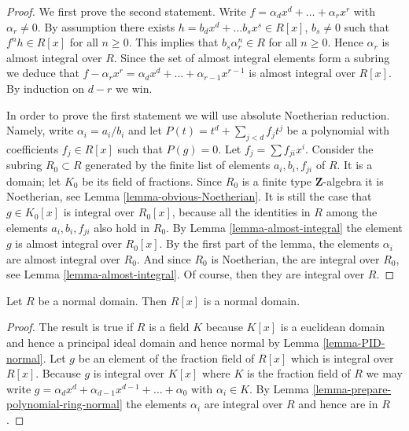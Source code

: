 \begin{proof}
We first prove the second statement.
Write $f = \alpha_d x^d + \ldots + \alpha_r x^r$
with $\alpha_r \not = 0$.
By assumption there exists $h = b_d x^d + \ldots b_s x^s \in R[x]$,
$b_s \not= 0$ such that $f^n h \in R[x]$ for all
$n \geq 0$. This implies that $b_s \alpha_r^n \in R$
for all $n \geq 0$. Hence $\alpha_r$ is almost
integral over $R$. Since the set of almost integral
elements form a subring we deduce that
$f - \alpha_r x^r = \alpha_d x^d + \ldots + \alpha_{r-1} x^{r-1}$
is almost integral over $R[x]$. By induction on $d-r$ we win.

\medskip\noindent
In order to prove the first statement we will use absolute Noetherian
reduction. Namely, write $\alpha_i = a_i / b_i$ and
let $P(t) = t^d + \sum_{j < d} f_j t^j$ be a polynomial
with coefficients $f_j \in R[x]$ such that $P(g) = 0$.
Let $f_j = \sum f_{ji}x^i$. Consider the subring
$R_0 \subset R$ generated by the finite list of elements
$a_i, b_i, f_{ji}$ of $R$. It is a domain; let
$K_0$ be its field of fractions. Since $R_0$ is a finite type
$\mathbf{Z}$-algebra it is Noetherian, see
Lemma \ref{lemma-obvious-Noetherian}. It is still
the case that $g \in K_0[x]$ is integral over $R_0[x]$,
because all the identities in $R$
among the elements $a_i, b_i, f_{ji}$ also hold in $R_0$.
By Lemma \ref{lemma-almost-integral} the element
$g$ is almost integral over $R_0[x]$. By the first part of
the lemma, the elements $\alpha_i$ are almost integral
over $R_0$. And since $R_0$ is Noetherian, the are
integral over $R_0$, see Lemma \ref{lemma-almost-integral}.
Of course, then they are integral over $R$.
\end{proof}

\begin{lemma}
\label{lemma-polynomial-ring-normal}
Let $R$ be a normal domain.
Then $R[x]$ is a normal domain.
\end{lemma}

\begin{proof}
The result is true if $R$ is a field $K$ because
$K[x]$ is a euclidean domain and hence a principal ideal
domain and hence normal by Lemma \ref{lemma-PID-normal}.
Let $g$ be an element of the fraction field of
$R[x]$ which is integral over $R[x]$. Because $g$
is integral over $K[x]$ where $K$ is the fraction
field of $R$ we may write $g = \alpha_d x^d + \alpha_{d-1}x^{d-1} +
\ldots + \alpha_0$ with $\alpha_i \in K$.
By Lemma \ref{lemma-prepare-polynomial-ring-normal}
the elements $\alpha_i$ are integral over $R$ and
hence are in $R$.
\end{proof}


